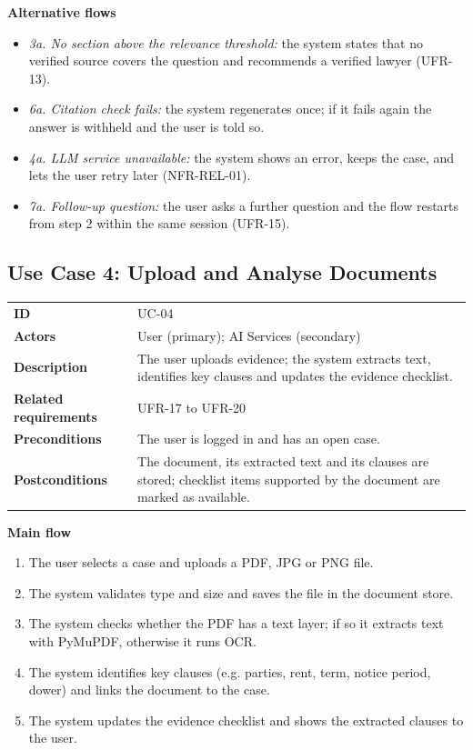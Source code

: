 \textbf{Alternative flows}

\begin{itemize}
  \item \emph{3a. No section above the relevance threshold:} the system states that no verified source covers the question and recommends a verified lawyer (UFR-13).
  \item \emph{6a. Citation check fails:} the system regenerates once; if it fails again the answer is withheld and the user is told so.
  \item \emph{4a. LLM service unavailable:} the system shows an error, keeps the case, and lets the user retry later (NFR-REL-01).
  \item \emph{7a. Follow-up question:} the user asks a further question and the flow restarts from step 2 within the same session (UFR-15).
\end{itemize}

\subsection{Use Case 4: Upload and Analyse Documents}

\begin{center}
\begin{tabular}{|L{3.08cm}|L{11.85cm}|}
\hline\headrow {} &  \\ \hline
\textbf{ID} & UC-04 \\ \hline
\textbf{Actors} & User (primary); AI Services (secondary) \\ \hline
\textbf{Description} & The user uploads evidence; the system extracts text, identifies key clauses and updates the evidence checklist. \\ \hline
\textbf{Related requirements} & UFR-17 to UFR-20 \\ \hline
\textbf{Preconditions} & The user is logged in and has an open case. \\ \hline
\textbf{Postconditions} & The document, its extracted text and its clauses are stored; checklist items supported by the document are marked as available. \\ \hline
\end{tabular}
\end{center}

\textbf{Main flow}

\begin{enumerate}
  \item The user selects a case and uploads a PDF, JPG or PNG file.
  \item The system validates type and size and saves the file in the document store.
  \item The system checks whether the PDF has a text layer; if so it extracts text with PyMuPDF, otherwise it runs OCR.
  \item The system identifies key clauses (e.g. parties, rent, term, notice period, dower) and links the document to the case.
  \item The system updates the evidence checklist and shows the extracted clauses to the user.
\end{enumerate}

